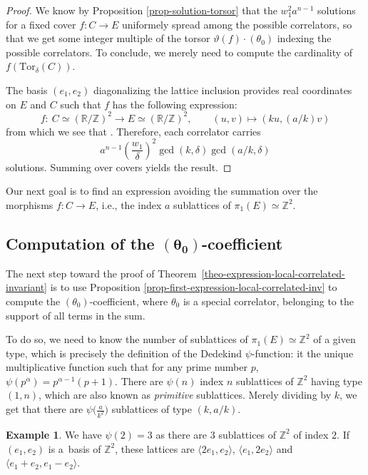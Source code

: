 \documentclass[pdftex]{sigma}
\newcommand{\Tor}{\mathrm{Tor}}
\newcommand{\ZZ}{\mathbb{Z}}
\newcommand{\RR}{\mathbb{R}}
\numberwithin{equation}{section}
\theoremstyle{definition}
\newtheorem{expl}[theo]{Example}
\begin{document}
\begin{proof}
We know by Proposition \ref{prop-solution-torsor} that the $w_1^2 a^{n-1}$ solutions for a fixed cover $f\colon C\to E$ uniformely spread among the possible correlators, so that we get some integer multiple of the torsor $\vartheta(f)\cdot(\theta_0)$ indexing the possible correlators. To conclude, we merely need to compute the cardinality of $f(\Tor_\delta(C))$.

The basis $(e_1,e_2)$ diagonalizing the lattice inclusion provides real coordinates on $E$ and $C$ such that $f$ has the following expression:
\[
f \colon \ C\simeq (\RR/\ZZ)^2 \longrightarrow E\simeq (\RR/\ZZ)^2, \qquad
 (u,v) \longmapsto (ku,(a/k)v )
 \]
from which we see that \smash{$|f(\Tor_\delta(C))|=\frac{\delta^2}{\gcd(k,\delta)\gcd(a/k,\delta)}$}. Therefore, each correlator carries
\[
a^{n-1}\left(\frac{w_1}{\delta}\right)^2\gcd(k,\delta)\gcd(a/k,\delta)
\]
 solutions. Summing over covers yields the result.
\end{proof}

Our next goal is to find an expression avoiding the summation over the morphisms $f\colon C\to E$, i.e., the index $a$ sublattices of $\pi_1(E)\simeq\ZZ^2$.



\subsection[Computation of the (theta\_0)-coefficient]{Computation of the $\boldsymbol{(\theta_0)}$-coefficient}
\label{sec-0-coeff}

The next step toward the proof of Theorem~\ref{theo-expression-local-correlated-invariant} is to use Proposition \ref{prop-first-expression-local-correlated-inv} to compute the $(\theta_0)$-coefficient, where $\theta_0$ is a special correlator, belonging to the support of all terms in the sum.

To do so, we need to know the number of sublattices of $\pi_1(E)\simeq\ZZ^2$ of a given type, which is precisely the definition of the Dedekind $\psi$-function: it the unique multiplicative function such that for any prime number $p$, $\psi(p^\alpha)=p^{\alpha-1}(p+1)$. There are $\psi(n)$ index $n$ sublattices of $\ZZ^2$ having type $(1,n)$, which are also known as \textit{primitive} sublattices. Merely dividing by $k$, we get that there are $\psi\bigl(\frac{a}{k^2}\bigr)$ sublattices of type $(k,a/k)$.

\begin{expl}
We have $\psi(2)=3$ as there are $3$ sublattices of $\ZZ^2$ of index $2$. If $(e_1,e_2)$ is a~basis of $\ZZ^2$, these lattices are $\langle 2e_1,e_2\rangle$, $\langle e_1,2e_2\rangle$ and $\langle e_1+e_2,e_1-e_2\rangle$.
\end{expl}
\end{document}
